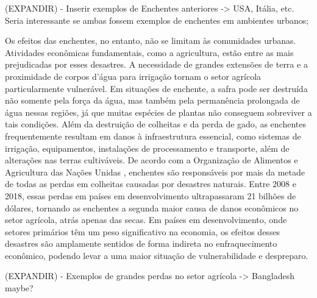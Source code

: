 (EXPANDIR) - Inserir exemplos de Enchentes anteriores -> USA, Itália, etc. Seria interessante se ambas fossem exemplos
de enchentes em ambientes urbanos;


Os efeitos das enchentes, no entanto, não se limitam às comunidades urbanas. Atividades econômicas fundamentais, como a
agricultura, estão entre as mais prejudicadas por esses desastres. A necessidade de grandes extensões de terra e a
proximidade de corpos d’água para irrigação tornam o setor agrícola particularmente vulnerável. Em situações de
enchente, a safra pode ser destruída não somente pela força da água, mas também pela permanência prolongada de água
nessas regiões, já que muitas espécies de plantas não conseguem sobreviver a tais condições. Além da destruição de
colheitas e da perda de gado, as enchentes frequentemente resultam em danos à infraestrutura essencial, como sistemas de
irrigação, equipamentos, instalações de processamento e transporte, além de alterações nas terras cultiváveis. De acordo
com a Organização de Alimentos e Agricultura das Nações Unidas \cite{onu}, enchentes são responsáveis por mais da metade
de todas as perdas em colheitas causadas por desastres naturais. Entre 2008 e 2018, essas perdas em países em
desenvolvimento ultrapassaram 21 bilhões de dólares, tornando as enchentes a segunda maior causa de danos econômicos no
setor agrícola, atrás apenas das secas. Em países em desenvolvimento, onde setores primários têm um peso significativo
na economia, os efeitos desses desastres são amplamente sentidos de forma indireta no enfraquecimento econômico, podendo
levar a uma maior situação de vulnerabilidade e despreparo.

(EXPANDIR) - Exemplos de grandes perdas no setor agrícola -> Bangladesh maybe? 


